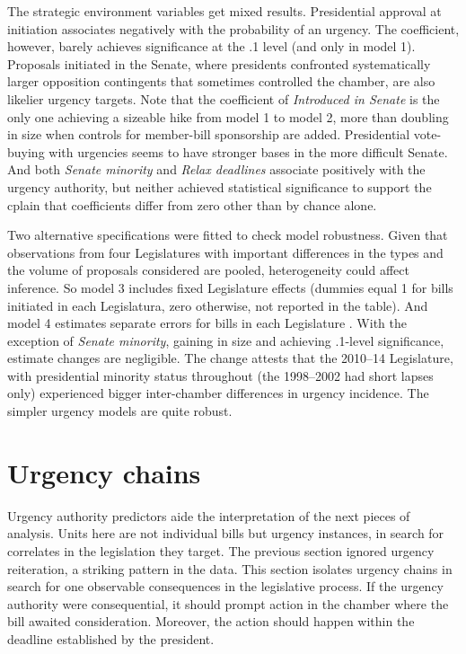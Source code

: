 \documentclass[letter,12pt]{article}
\begin{document}
The strategic environment variables get mixed results. Presidential approval at initiation associates negatively with the probability of an urgency. The coefficient, however, barely achieves significance at the .1 level (and only in model 1). Proposals initiated in the Senate, where presidents confronted systematically larger opposition contingents that sometimes controlled the chamber, are also likelier urgency targets. Note that the coefficient of \emph{Introduced in Senate} is the only one achieving a sizeable hike from model 1 to model 2, more than doubling in size when controls for member-bill sponsorship are added. Presidential vote-buying with urgencies seems to have stronger bases in the more difficult Senate. And both \emph{Senate minority} and \emph{Relax deadlines} associate positively with the urgency authority, but neither achieved statistical significance to support the cplain that coefficients differ from zero other than by chance alone. 

Two alternative specifications were fitted to check model robustness. Given that observations from four Legislatures with important differences in the types and the volume of proposals considered \citep{aleman.navia.UrgChi.2009} are pooled, heterogeneity could affect inference. So model 3 includes fixed Legislature effects (dummies equal 1 for bills initiated in each Legislatura, zero otherwise, not reported in the table). And model 4 estimates separate errors for bills in each Legislature \citep[a so-called mixed effects model,][262,302]{gelman.hill.2007}. With the exception of \emph{Senate minority}, gaining in size and achieving .1-level significance, estimate changes are negligible. The change attests that the 2010--14 Legislature, with presidential minority status throughout (the 1998--2002 had short lapses only) experienced bigger inter-chamber differences in urgency incidence. The simpler urgency models are quite robust. 

\section{Urgency chains}

Urgency authority predictors aide the interpretation of the next pieces of analysis. Units here are not individual bills but urgency instances, in search for correlates in the legislation they target. The previous section ignored urgency reiteration, a striking pattern in the data. This section isolates urgency chains in search for one observable consequences in the legislative process. If the urgency authority were consequential, it should prompt action in the chamber where the bill awaited consideration. Moreover, the action should happen within the deadline established by the president. 
\end{document}
